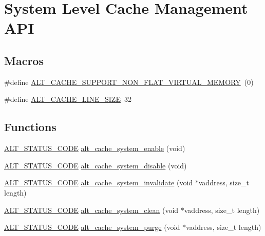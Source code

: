 \hypertarget{group__CACHE__SYS}{}\section{System Level Cache Management A\+PI}
\label{group__CACHE__SYS}
\subsection*{Macros}
\begin{DoxyCompactItemize}
\item 
\#define \mbox{\hyperlink{group__CACHE__SYS_ga6f5aef1f8665ce92140f797a40107362}{A\+L\+T\+\_\+\+C\+A\+C\+H\+E\+\_\+\+S\+U\+P\+P\+O\+R\+T\+\_\+\+N\+O\+N\+\_\+\+F\+L\+A\+T\+\_\+\+V\+I\+R\+T\+U\+A\+L\+\_\+\+M\+E\+M\+O\+RY}}~(0)
\item 
\#define \mbox{\hyperlink{group__CACHE__SYS_ga86dd25e6cd718fa78826b612132df84e}{A\+L\+T\+\_\+\+C\+A\+C\+H\+E\+\_\+\+L\+I\+N\+E\+\_\+\+S\+I\+ZE}}~32
\end{DoxyCompactItemize}
\subsection*{Functions}
\begin{DoxyCompactItemize}
\item 
\mbox{\hyperlink{hwlib_8h_abdb0d369f069723ca55d6c94bcaaaa12}{A\+L\+T\+\_\+\+S\+T\+A\+T\+U\+S\+\_\+\+C\+O\+DE}} \mbox{\hyperlink{group__CACHE__SYS_ga7e2d77afe993421ee6f3ba6a6bc419ee}{alt\+\_\+cache\+\_\+system\+\_\+enable}} (void)
\item 
\mbox{\hyperlink{hwlib_8h_abdb0d369f069723ca55d6c94bcaaaa12}{A\+L\+T\+\_\+\+S\+T\+A\+T\+U\+S\+\_\+\+C\+O\+DE}} \mbox{\hyperlink{group__CACHE__SYS_ga1a7fb4dd364afc5a7ae8c68a5d1bdac6}{alt\+\_\+cache\+\_\+system\+\_\+disable}} (void)
\item 
\mbox{\hyperlink{hwlib_8h_abdb0d369f069723ca55d6c94bcaaaa12}{A\+L\+T\+\_\+\+S\+T\+A\+T\+U\+S\+\_\+\+C\+O\+DE}} \mbox{\hyperlink{group__CACHE__SYS_ga50d87865a68390d96a7f5ddadb465d16}{alt\+\_\+cache\+\_\+system\+\_\+invalidate}} (void $\ast$vaddress, size\+\_\+t length)
\item 
\mbox{\hyperlink{hwlib_8h_abdb0d369f069723ca55d6c94bcaaaa12}{A\+L\+T\+\_\+\+S\+T\+A\+T\+U\+S\+\_\+\+C\+O\+DE}} \mbox{\hyperlink{group__CACHE__SYS_gad6f5aeeac2c752c650e9faa1c7df0e97}{alt\+\_\+cache\+\_\+system\+\_\+clean}} (void $\ast$vaddress, size\+\_\+t length)
\item 
\mbox{\hyperlink{hwlib_8h_abdb0d369f069723ca55d6c94bcaaaa12}{A\+L\+T\+\_\+\+S\+T\+A\+T\+U\+S\+\_\+\+C\+O\+DE}} \mbox{\hyperlink{group__CACHE__SYS_gaa3019ba404096846ee255af73db6e85c}{alt\+\_\+cache\+\_\+system\+\_\+purge}} (void $\ast$vaddress, size\+\_\+t length)
\end{DoxyCompactItemize}


